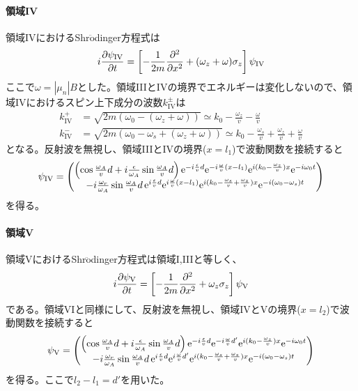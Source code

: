 \paragraph{領域IV}
領域IVにおけるShr$\ddot{\mathrm{o}}$dinger方程式は
\begin{equation}
i\frac{\partial \psi_\mathrm{IV}}{\partial t}= \left[-\frac{1}{2m} \frac{\partial^2}{\partial x^2} +(\omega_z+\omega) \sigma_z\right] \psi_\mathrm{IV}
\end{equation}
ここで$\omega=|\mu_n|B$とした。領域IIIとIVの境界でエネルギーは変化しないので、領域IVにおけるスピン上下成分の波数$k^\pm_\mathrm{IV}$は
\begin{align}
k^+_\mathrm{IV}&=\sqrt{2m(\omega_0-(\omega_z+\omega))}\simeq k_0 -\frac{\omega_z}{v}-\frac{\omega}{v} \\
k^-_\mathrm{IV}&=\sqrt{2m(\omega_0-\omega_s+(\omega_z+\omega))}\simeq k_0 -\frac{\omega_s}{v}+\frac{\omega_z}{v}+\frac{\omega}{v}
\end{align}
となる。反射波を無視し、領域IIIとIVの境界($x=l_1$)で波動関数を接続すると
\begin{equation}
\psi_\mathrm{IV}=\begin{pmatrix} \left(\cos \frac{\omega_A}{v}d +i\frac{\epsilon}{\omega_A} \sin \frac{\omega_A}{v}d\right) \mathrm{e}^{-i\frac{\epsilon}{v} d} \mathrm{e}^{-i\frac{\omega}{v} (x-l_1)} \mathrm{e}^{i(k_0-\frac{\omega_z}{v})x}\mathrm{e}^{-i\omega_0t} \\ -i \frac{\omega_r}{\omega_A} \sin \frac{\omega_A}{v}d  \, \mathrm{e}^{i\frac{\epsilon}{v}d} \mathrm{e}^{i\frac{\omega}{v}(x-l_1)} \mathrm{e}^{i(k_0-\frac{\omega_s}{v}+\frac{\omega_z}{v})x}\mathrm{e}^{-i(\omega_0-\omega_s)t} \end{pmatrix}
\end{equation}
を得る。

\paragraph{領域V}
領域VにおけるShr$\ddot{\mathrm{o}}$dinger方程式は領域I,IIIと等しく、
\begin{equation}
i\frac{\partial \psi_\mathrm{V}}{\partial t}= \left[-\frac{1}{2m} \frac{\partial^2}{\partial x^2} +\omega_z \sigma_z\right] \psi_\mathrm{V}
\end{equation}
である。領域VIと同様にして、反射波を無視し、領域IVとVの境界($x=l_2$)で波動関数を接続すると
\begin{equation}
\psi_\mathrm{V}=\begin{pmatrix} \left(\cos \frac{\omega_A}{v}d +i\frac{\epsilon}{\omega_A} \sin \frac{\omega_A}{v}d\right) \mathrm{e}^{-i\frac{\epsilon}{v} d} \mathrm{e}^{-i\frac{\omega}{v} d'} \mathrm{e}^{i(k_0-\frac{\omega_z}{v})x}\mathrm{e}^{-i\omega_0t} \\ -i \frac{\omega_r}{\omega_A} \sin \frac{\omega_A}{v}d  \, \mathrm{e}^{i\frac{\epsilon}{v}d} \mathrm{e}^{i\frac{\omega}{v} d'} \mathrm{e}^{i(k_0-\frac{\omega_s}{v}+\frac{\omega_z}{v})x}\mathrm{e}^{-i(\omega_0-\omega_s)t} \end{pmatrix} \label{Nonreso_psi5}
\end{equation}
を得る。ここで$l_2-l_1=d'$を用いた。

